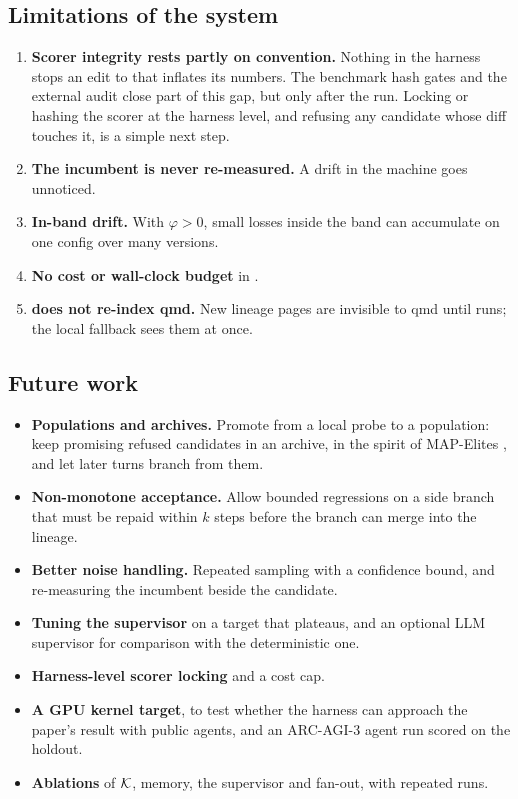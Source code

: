 \subsection{Limitations of the system}

\begin{enumerate}[leftmargin=*,itemsep=2pt]
  \item \textbf{Scorer integrity rests partly on convention.} Nothing in the harness stops an edit to
     that inflates its numbers. The benchmark hash gates and the external audit
    close part of this gap, but only after the run. Locking or hashing the scorer at the harness
    level, and refusing any candidate whose diff touches it, is a simple next step.
  \item \textbf{The incumbent is never re-measured.} A drift in the machine goes unnoticed.
  \item \textbf{In-band drift.} With $\varphi > 0$, small losses inside the band can accumulate on one
    config over many versions.
  \item \textbf{No cost or wall-clock budget} in .
  \item \textbf{ does not re-index qmd.} New lineage pages are invisible to qmd until
     runs; the local fallback sees them at once.
\end{enumerate}

\subsection{Future work}

\begin{itemize}[leftmargin=*,itemsep=2pt]
  \item \textbf{Populations and archives.} Promote  from a local probe to a population:
    keep promising refused candidates in an archive, in the spirit of MAP-Elites
    \citep{mouret2015mapelites}, and let later turns branch from them.
  \item \textbf{Non-monotone acceptance.} Allow bounded regressions on a side branch that must be
    repaid within $k$ steps before the branch can merge into the lineage.
  \item \textbf{Better noise handling.} Repeated sampling with a confidence bound, and re-measuring
    the incumbent beside the candidate.
  \item \textbf{Tuning the supervisor} on a target that plateaus, and an optional LLM supervisor for
    comparison with the deterministic one.
  \item \textbf{Harness-level scorer locking} and a cost cap.
  \item \textbf{A GPU kernel target}, to test whether the harness can approach the paper's result
    with public agents, and an ARC-AGI-3 agent run scored on the holdout.
  \item \textbf{Ablations} of $\mathcal{K}$, memory, the supervisor and fan-out, with repeated runs.
\end{itemize}
